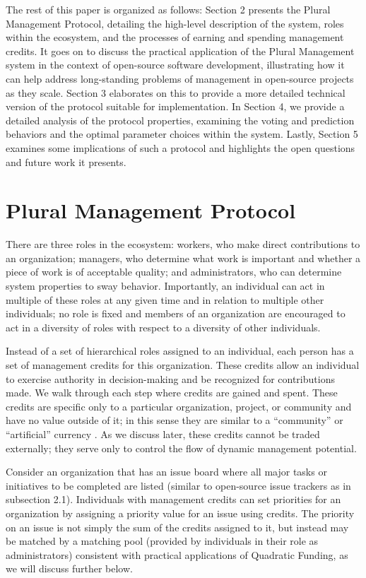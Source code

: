 \documentclass{article}
\begin{document}
The rest of this paper is organized as follows: Section 2 presents the Plural Management Protocol, detailing the high-level description of the system, roles within the ecosystem, and the processes of earning and spending management credits. It goes on to discuss the practical application of the Plural Management system in the context of open-source software development, illustrating how it can help address long-standing problems of management in open-source projects as they scale. Section 3 elaborates on this to provide a more detailed technical version of the protocol suitable for implementation. In Section 4, we provide a detailed analysis of the protocol properties, examining the voting and prediction behaviors and the optimal parameter choices within the system. Lastly, Section 5 examines some implications of such a protocol and highlights the open questions and future work it presents.

\section{Plural Management Protocol}
There are three roles in the ecosystem: workers, who make direct contributions to an organization; managers, who determine what work is important and whether a piece of work is of acceptable quality; and administrators, who can determine system properties to sway behavior. Importantly, an individual can act in multiple of these roles at any given time and in relation to multiple other individuals; no role is fixed and members of an organization are encouraged to act in a diversity of roles with respect to a diversity of other individuals.

Instead of a set of hierarchical roles assigned to an individual, each person has a set of management credits for this organization. These credits allow an individual to exercise authority in decision-making and be recognized for contributions made. We walk through each step where credits are gained and spent. These credits are specific only to a particular organization, project, or community and have no value outside of it; in this sense they are similar to a ``community'' or ``artificial'' currency \cite{blanc2018making}. As we discuss later, these credits cannot be traded externally; they serve only to control the flow of dynamic management potential.

Consider an organization that has an issue board where all major tasks or initiatives to be completed are listed (similar to open-source issue trackers as in subsection 2.1). Individuals with management credits can set priorities for an organization by assigning a priority value for an issue using credits. The priority on an issue is not simply the sum of the credits assigned to it, but instead may be matched by a matching pool (provided by individuals in their role as administrators) consistent with practical applications of Quadratic Funding, as we will discuss further below.
\end{document}
